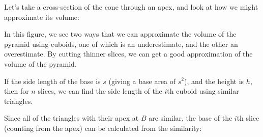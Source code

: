\documentclass{article}
\begin{document}
Let's take a cross-section of the cone through an apex, and look at how we might
approximate its volume:

\begin{center}
\end{center}

In this figure, we see two ways that we can approximate the volume of the pyramid using
cuboids, one of which is an underestimate, and the other an overestimate. By cutting thinner slices,
we can get a good approximation of the volume of the pyramid.

If the side length of the base is $s$ (giving a base area of $s^2$), and the height is $h$, then for $n$ slices, we can find the side length of the $i$th cuboid using similar triangles. 

\begin{center}
\end{center}

Since all of the triangles with their apex at $B$ are similar, the base of the $i$th slice (counting from the apex) can be calculated from the similarity:
\end{document}
